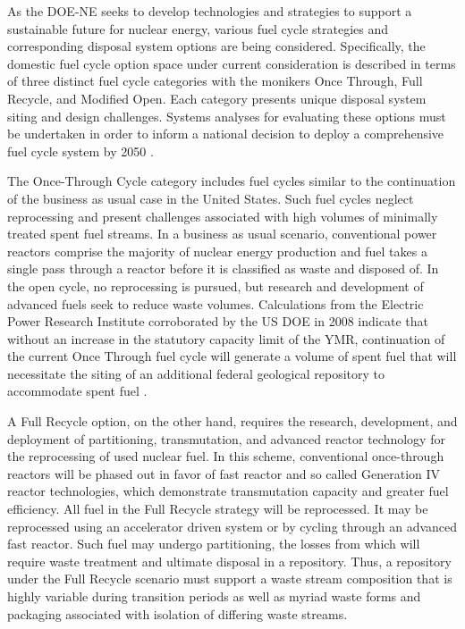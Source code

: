 As the DOE-NE seeks to develop technologies and strategies to support a 
sustainable future for nuclear energy, various fuel cycle strategies and 
corresponding disposal system options are being considered.  Specifically, the 
domestic fuel cycle option space under current consideration is described in 
terms of three distinct fuel cycle categories with the monikers Once Through, 
Full Recycle, and Modified Open. Each category presents unique disposal system 
siting and design challenges. Systems analyses for evaluating these options must 
be undertaken in order to inform a national decision to deploy a comprehensive 
fuel cycle system by 2050 \cite{doe_nuclear_2010}. 


The Once-Through Cycle category includes fuel cycles similar to the continuation 
of the business as usual case in the United States.
Such fuel cycles neglect reprocessing and present challenges associated with 
high volumes of minimally treated spent fuel streams.  In a business as usual 
scenario, conventional power reactors comprise the majority of nuclear energy 
production and fuel takes a single pass through a reactor before it is 
classified as waste and disposed of. In the open cycle, no reprocessing is 
pursued, but research and development of advanced fuels seek to reduce waste 
volumes. Calculations from the Electric Power Research Institute corroborated by 
the \gls{US} \gls{DOE} in 2008 indicate that without an increase in the statutory 
capacity limit of the \gls{YMR}, continuation of the current Once Through fuel 
cycle will generate a volume of spent fuel that will necessitate
the siting of an additional federal geological repository to accommodate spent 
fuel \cite{kessler_room_2006, doe_report_2008}. 


A Full Recycle option, on the other hand, requires the research, development, 
and deployment of partitioning, transmutation, and advanced reactor technology 
for the reprocessing of used nuclear fuel.  In this scheme, conventional 
once-through reactors will be phased out in favor of fast reactor and so called 
Generation IV reactor technologies, which demonstrate transmutation capacity and 
greater fuel efficiency. All fuel in the Full Recycle strategy will be 
reprocessed. It may be reprocessed using  an accelerator driven system or by 
cycling through an advanced fast reactor. Such fuel may undergo partitioning, 
the losses from which will require waste treatment and ultimate disposal in a 
repository. Thus, a repository under the Full Recycle scenario must support
a waste stream composition that is highly variable during transition periods as 
well as myriad waste forms and packaging associated with isolation of differing 
waste streams.

